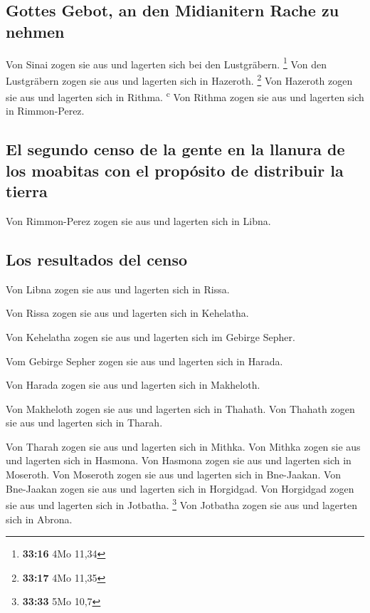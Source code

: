 \hypertarget{gottes-gebot-an-den-midianitern-rache-zu-nehmen}{%
\subsection{Gottes Gebot, an den Midianitern Rache zu
nehmen}\label{gottes-gebot-an-den-midianitern-rache-zu-nehmen}}

 Von Sinai zogen sie aus und lagerten sich bei den
Lustgräbern. \footnote{\textbf{33:16} 4Mo 11,34}  Von den
Lustgräbern zogen sie aus und lagerten sich in Hazeroth. \footnote{\textbf{33:17}
  4Mo 11,35}  Von Hazeroth zogen sie aus und lagerten
sich in Rithma. \textsuperscript{c}  Von Rithma zogen sie
aus und lagerten sich in Rimmon-Perez.

\hypertarget{el-segundo-censo-de-la-gente-en-la-llanura-de-los-moabitas-con-el-propuxf3sito-de-distribuir-la-tierra}{%
\subsection{El segundo censo de la gente en la llanura de los moabitas
con el propósito de distribuir la
tierra}\label{el-segundo-censo-de-la-gente-en-la-llanura-de-los-moabitas-con-el-propuxf3sito-de-distribuir-la-tierra}}

 Von Rimmon-Perez zogen sie aus und lagerten sich in
Libna.

\hypertarget{los-resultados-del-censo-1}{%
\subsection{Los resultados del censo}\label{los-resultados-del-censo-1}}

 Von Libna zogen sie aus und lagerten sich in Rissa.

 Von Rissa zogen sie aus und lagerten sich in Kehelatha.

 Von Kehelatha zogen sie aus und lagerten sich im Gebirge
Sepher.

 Vom Gebirge Sepher zogen sie aus und lagerten sich in
Harada.

 Von Harada zogen sie aus und lagerten sich in Makheloth.

 Von Makheloth zogen sie aus und lagerten sich in
Thahath.  Von Thahath zogen sie aus und lagerten sich in
Tharah.

 Von Tharah zogen sie aus und lagerten sich in Mithka.
 Von Mithka zogen sie aus und lagerten sich in Hasmona.
 Von Hasmona zogen sie aus und lagerten sich in Moseroth.
 Von Moseroth zogen sie aus und lagerten sich in
Bne-Jaakan.  Von Bne-Jaakan zogen sie aus und lagerten
sich in Horgidgad.  Von Horgidgad zogen sie aus und
lagerten sich in Jotbatha. \footnote{\textbf{33:33} 5Mo 10,7}
 Von Jotbatha zogen sie aus und lagerten sich in Abrona.

